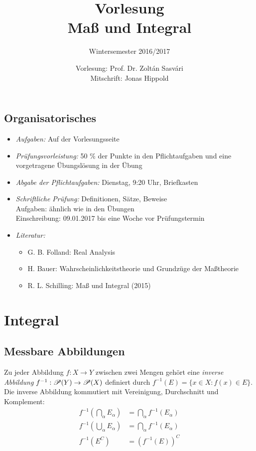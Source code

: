 \documentclass[
 a4paper,
 12pt,
 parskip=half
 ]{scrreprt}
\title{Vorlesung\\Maß und Integral}
\subtitle{Wintersemester 2016/2017}
\author{Vorlesung: Prof. Dr. Zoltán Sasvári\\Mitschrift: Jonas Hippold}
\theoremstyle{plain}
\theoremstyle{definition}
\numberwithin{equation}{section}
\begin{document}
\maketitle

\tableofcontents

\clearpage

\section*{Organisatorisches}
 \begin{itemize}
  \item \emph{Aufgaben:} Auf der Vorlesungsseite
  \item \emph{Prüfungsvorleistung:} 50 \% der Punkte in den Pflichtaufgaben und eine vorgetragene Übungslösung in der Übung
  \item \emph{Abgabe der Pflichtaufgaben:} Dienstag, 9:20 Uhr, Briefkasten 
  \item \emph{Schriftliche Prüfung:} Definitionen, Sätze, Beweise \\
   Aufgaben: ähnlich wie in den Übungen \\
   Einschreibung: 09.01.2017 bis eine Woche vor Prüfungstermin
  \item \emph{Literatur:}
   \begin{itemize}
    \item G. B. Folland: Real Analysis
    \item H. Bauer: Wahrscheinlichkeitstheorie und Grundzüge der Maßtheorie
    \item R. L. Schilling: Maß und Integral (2015)
   \end{itemize}
 \end{itemize}



\clearpage

\chapter{Integral}
\section{Messbare Abbildungen}
Zu jeder Abbildung $f:X \to Y$ zwischen zwei Mengen gehört eine \emph{inverse Abbildung} $f^{-1}:\mathscr{P}(Y) \to \mathscr{P}(X)$ definiert durch $f^{-1}(E) = \{ x \in X : f(x) \in E \}.$ Die inverse Abbildung kommutiert mit Vereinigung, Durchschnitt und Komplement:
\begin{equation}
 \begin{aligned}
 f^{-1} \left( \bigcap_\alpha E_\alpha \right) &= \bigcap_\alpha f^{-1}(E_\alpha) \\
 f^{-1} \left( \bigcup_\alpha E_\alpha \right) &= \bigcap_\alpha f^{-1}(E_\alpha) \\
 f^{-1} ( E^C ) &= (f^{-1}(E) )^C
 \end{aligned}
 \tag{$\ast$}
\end{equation}
\end{document}
